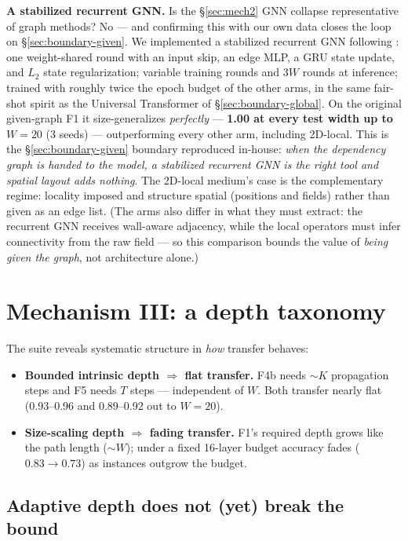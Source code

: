 \documentclass[11pt]{article}
\begin{document}
\textbf{A stabilized recurrent GNN.} Is the \S\ref{sec:mech2} GNN collapse
representative of graph methods? No --- and confirming this with our own data
closes the loop on \S\ref{sec:boundary-given}. We implemented a stabilized
recurrent GNN following \citet{groetschla2022recurrent}: one weight-shared
round with an input skip, an edge MLP, a GRU state update, and $L_2$ state
regularization; variable training rounds and $3W$ rounds at inference;
trained with roughly twice the epoch budget of the other arms, in the same
fair-shot spirit as the Universal Transformer of
\S\ref{sec:boundary-global}. On the original given-graph F1 it
size-generalizes \emph{perfectly} --- \textbf{1.00 at every test width up to
$W = 20$} (3 seeds) --- outperforming every other arm, including 2D-local.
This is the \S\ref{sec:boundary-given} boundary reproduced in-house:
\emph{when the dependency graph is handed to the model, a stabilized
recurrent GNN is the right tool and spatial layout adds nothing}. The
2D-local medium's case is the complementary regime: locality imposed and
structure spatial (positions and fields) rather than given as an edge list.
(The arms also differ in what they must extract: the recurrent GNN receives
wall-aware adjacency, while the local operators must infer connectivity from
the raw field --- so this comparison bounds the value of \emph{being given
the graph}, not architecture alone.)

\section{Mechanism III: a depth taxonomy}\label{sec:mech3}

The suite reveals systematic structure in \emph{how} transfer behaves:

\begin{itemize}
\item \textbf{Bounded intrinsic depth $\Rightarrow$ flat transfer.} F4b needs
  $\sim K$ propagation steps and F5 needs $T$ steps --- independent of $W$.
  Both transfer nearly flat (0.93--0.96 and 0.89--0.92 out to $W = 20$).
\item \textbf{Size-scaling depth $\Rightarrow$ fading transfer.} F1's
  required depth grows like the path length ($\sim W$); under a fixed
  16-layer budget accuracy fades ($0.83 \to 0.73$) as instances outgrow the
  budget.
\end{itemize}

\subsection{Adaptive depth does not (yet) break the bound}\label{sec:adaptive}
\end{document}
